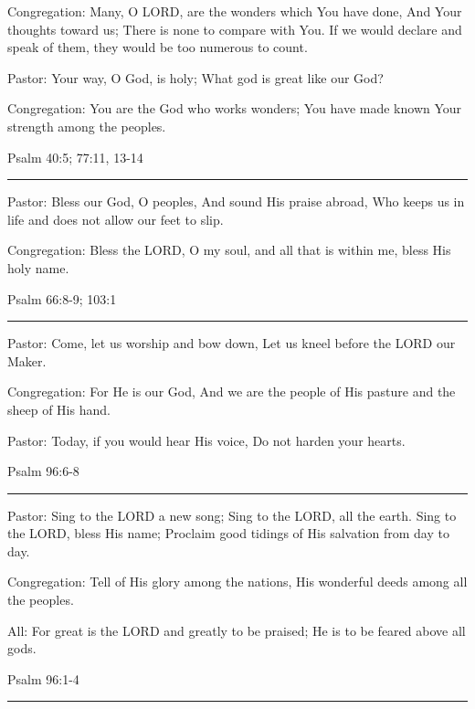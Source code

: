 \documentclass[]{book}
\begin{document}
Congregation: Many, O LORD, are the wonders which You have done, And Your thoughts toward us; There is none to compare with You. If we would declare and speak of them, they would be too numerous to count.

Pastor: Your way, O God, is holy; What god is great like our God?

Congregation: You are the God who works wonders; You have made known Your strength among the peoples.

Psalm 40:5; 77:11, 13-14 \textbar{}

\begin{center}\rule{0.5\linewidth}{\linethickness}\end{center}

Pastor: Bless our God, O peoples, And sound His praise abroad, Who keeps us in life and does not allow our feet to slip.

Congregation: Bless the LORD, O my soul, and all that is within me, bless His holy name.

Psalm 66:8-9; 103:1 \textbar{}

\begin{center}\rule{0.5\linewidth}{\linethickness}\end{center}

Pastor: Come, let us worship and bow down, Let us kneel before the LORD our Maker.

Congregation: For He is our God, And we are the people of His pasture and the sheep of His hand.

Pastor: Today, if you would hear His voice, Do not harden your hearts.

Psalm 96:6-8 \textbar{}

\begin{center}\rule{0.5\linewidth}{\linethickness}\end{center}

Pastor: Sing to the LORD a new song; Sing to the LORD, all the earth. Sing to the LORD, bless His name; Proclaim good tidings of His salvation from day to day.

Congregation: Tell of His glory among the nations, His wonderful deeds among all the peoples.

All: For great is the LORD and greatly to be praised; He is to be feared above all gods.

Psalm 96:1-4 \textbar{}

\begin{center}\rule{0.5\linewidth}{\linethickness}\end{center}
\end{document}
